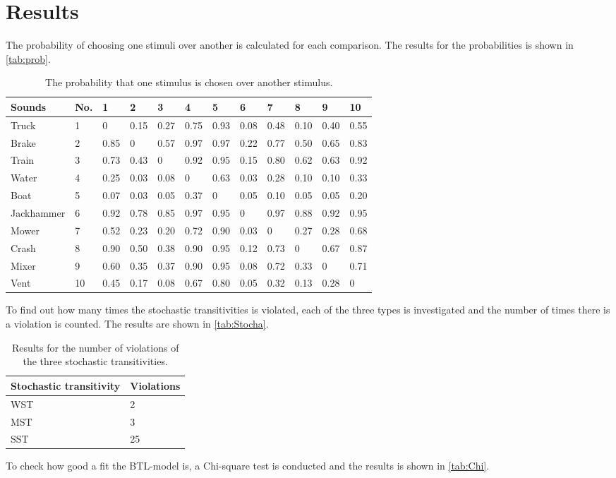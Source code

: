 \section*{Results}
\label{results}
%
The probability of choosing one stimuli over another is calculated for each comparison. The results for the probabilities is shown in \autoref{tab:prob}. 
%
\begin{table}[H]
\centering
\begin{tabular}{@{}llllllllllll@{}}
\toprule
Sounds     & No. & 1    & 2    & 3    & 4    & 5    & 6    & 7    & 8    & 9    & 10 \\ \midrule
Truck      & 1   & 0    & 0.15 & 0.27 & 0.75 & 0.93 & 0.08 & 0.48 & 0.10 & 0.40 & 0.55 \\
Brake      & 2   & 0.85 & 0    & 0.57 & 0.97 & 0.97 & 0.22 & 0.77 & 0.50 & 0.65 & 0.83 \\
Train      & 3   & 0.73 & 0.43 & 0    & 0.92 & 0.95 & 0.15 & 0.80 & 0.62 & 0.63 & 0.92 \\
Water      & 4   & 0.25 & 0.03 & 0.08 & 0    & 0.63 & 0.03 & 0.28 & 0.10 & 0.10 & 0.33 \\
Boat       & 5   & 0.07 & 0.03 & 0.05 & 0.37 & 0    & 0.05 & 0.10 & 0.05 & 0.05 & 0.20 \\
Jackhammer & 6   & 0.92 & 0.78 & 0.85 & 0.97 & 0.95 & 0    & 0.97 & 0.88 & 0.92 & 0.95 \\
Mower      & 7   & 0.52 & 0.23 & 0.20 & 0.72 & 0.90 & 0.03 & 0    & 0.27 & 0.28 & 0.68 \\
Crash      & 8   & 0.90 & 0.50 & 0.38 & 0.90 & 0.95 & 0.12 & 0.73 & 0    & 0.67 & 0.87 \\
Mixer      & 9   & 0.60 & 0.35 & 0.37 & 0.90 & 0.95 & 0.08 & 0.72 & 0.33 & 0    & 0.71 \\
Vent       & 10  & 0.45 & 0.17 & 0.08 & 0.67 & 0.80 & 0.05 & 0.32 & 0.13 & 0.28 & 0  \\ \bottomrule
\end{tabular}
\caption{The probability that one stimulus is chosen over another stimulus.}
\label{tab:prob}
\end{table} 
\noindent 
%
To find out how many times the stochastic transitivities is violated, each of the three types is investigated and the number of times there is a violation is counted. The results are shown in \autoref{tab:Stocha}. 
%
\begin{table}[H]
\centering
\begin{tabular}{@{}ll@{}}
\toprule
Stochastic transitivity     & Violations \\ \midrule
WST      & 2   \\
MST      & 3   \\
SST      & 25   \\ \bottomrule
\end{tabular}
\caption{Results for the number of violations of the three stochastic transitivities.}
\label{tab:Stocha}
\end{table} 
\noindent 
%
To check how good a fit the BTL-model is, a Chi-square test is conducted and the results is shown in \autoref{tab:Chi}. 


